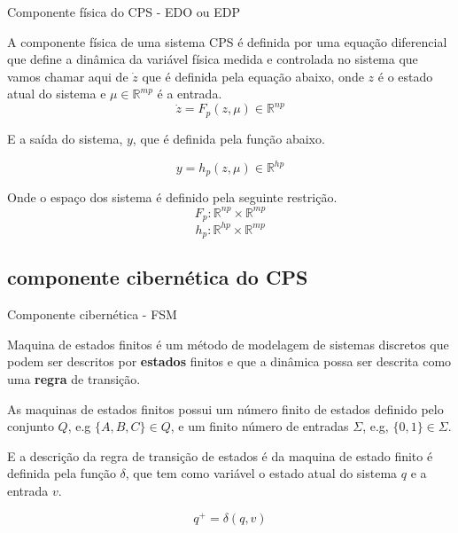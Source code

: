 \documentclass{beamer}
\begin{document}
\begin{frame}{Componente física do CPS - EDO ou EDP}
	\par A componente física de uma sistema CPS é definida por uma equação diferencial que define a dinâmica da variável física medida e controlada no sistema que vamos chamar aqui de $\dot{z}$ que é definida pela equação abaixo, onde $z$ é o estado atual do sistema e $\mu \in \mathbb{R}^{mp}$ é a entrada.
	\begin{equation}
		\dot{z} = F_p(z,\mu) \in \mathbb{R}^{np}
	\end{equation}
	
	\par E a saída do sistema, $y$, que é definida pela função abaixo.
	
	\begin{equation}
		y=h_p(z,\mu)\in \mathbb{R}^{hp}
	\end{equation}
	
	\par Onde o espaço dos sistema é definido pela seguinte restrição.
	\begin{equation}
		F_p:\mathbb{R}^{np} \times \mathbb{R}^{mp}
	\end{equation}
	\begin{equation}
		h_p:\mathbb{R}^{hp} \times \mathbb{R}^{mp}
	\end{equation}
\end{frame}

\subsection{componente cibernética do CPS}

\begin{frame}{Componente cibernética - FSM}	
	\begin{definition}
		Maquina de estados finitos é um método de modelagem de sistemas discretos que podem ser descritos por \textbf{estados} finitos e que a dinâmica possa ser descrita como uma \textbf{regra} de transição.
	\end{definition}
	
	\par As maquinas de estados finitos possui um número finito de estados definido pelo conjunto $Q$, e.g $\{A,B,C\} \in Q$, e um finito número de entradas $\Sigma$, e.g, $\{0,1\} \in \Sigma$.
	\par E a descrição da regra de transição de estados é da maquina de estado finito é definida pela função $\delta$, que tem como variável o estado atual do sistema $q$ e a entrada $v$.
	
	\begin{equation}
		q^{+}=\delta(q,v)
	\end{equation}
\end{frame}
\end{document}
